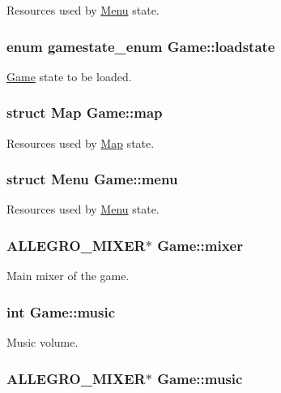 Resources used by \hyperlink{structMenu}{Menu} state. \hypertarget{structGame_a026bb8ebb6454c0d87dea503eafa9197}{
\subsubsection[{loadstate}]{\setlength{\rightskip}{0pt plus 5cm}enum {\bf gamestate\-\_\-enum} Game\-::loadstate}}\label{structGame_a026bb8ebb6454c0d87dea503eafa9197}
\hyperlink{structGame}{Game} state to be loaded. \hypertarget{structGame_aaab875b9e556df53251db40341046cab}{
\subsubsection[{map}]{\setlength{\rightskip}{0pt plus 5cm}struct {\bf Map} Game\-::map}}\label{structGame_aaab875b9e556df53251db40341046cab}
Resources used by \hyperlink{structMap}{Map} state. \hypertarget{structGame_ad120de2e84e2d857dd83fc1116176f21}{
\subsubsection[{menu}]{\setlength{\rightskip}{0pt plus 5cm}struct {\bf Menu} Game\-::menu}}\label{structGame_ad120de2e84e2d857dd83fc1116176f21}
Resources used by \hyperlink{structMenu}{Menu} state. \hypertarget{structGame_ab8265074be4df5408a7c2fc1fb89dfc4}{
\subsubsection[{mixer}]{\setlength{\rightskip}{0pt plus 5cm}A\-L\-L\-E\-G\-R\-O\-\_\-\-M\-I\-X\-E\-R$\ast$ Game\-::mixer}}\label{structGame_ab8265074be4df5408a7c2fc1fb89dfc4}
Main mixer of the game. \hypertarget{structGame_aa8eff7d132a51e5ca97a376433790426}{
\subsubsection[{music}]{\setlength{\rightskip}{0pt plus 5cm}int Game\-::music}}\label{structGame_aa8eff7d132a51e5ca97a376433790426}
Music volume. \hypertarget{structGame_a49891173b349e56fcda6b0a0e39a47ee}{
\subsubsection[{music}]{\setlength{\rightskip}{0pt plus 5cm}A\-L\-L\-E\-G\-R\-O\-\_\-\-M\-I\-X\-E\-R$\ast$ Game\-::music}}\label{structGame_a49891173b349e56fcda6b0a0e39a47ee}

